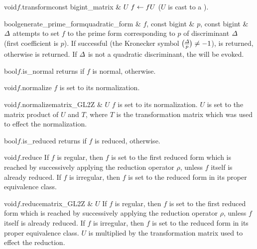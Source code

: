 \begin{fcode}{void}{$f$.transform}{const bigint_matrix & $U$}
  $f \leftarrow fU$ ($U$ is cast to a ).
\end{fcode}

\begin{fcode}{bool}{generate_prime_form}{quadratic_form & $f$, const bigint & $p$,
    const bigint & $\varDelta$}%
  attempts to set $f$ to the prime form corresponding to $p$ of discriminant $\varDelta$ (first
  coefficient is $p$).  If successful (the Kronecker symbol $\kronecker{\D}{p} \neq -1$), \TRUE
  is returned, otherwise \FALSE is returned.  If $\varDelta$ is not a quadratic discriminant, the \LEH
  will be evoked.
\end{fcode}




\begin{fcode}{bool}{$f$.is_normal}{}
  returns \TRUE if $f$ is normal, \FALSE otherwise.
\end{fcode}

\begin{fcode}{void}{$f$.normalize}{}
  $f$ is set to its normalization.
\end{fcode}

\begin{fcode}{void}{$f$.normalize}{matrix_GL2Z & $U$}
  $f$ is set to its normalization.  $U$ is set to the matrix product of $U$ and $T$, where $T$
  is the transformation matrix which was used to effect the normalization.
\end{fcode}

\begin{fcode}{bool}{$f$.is_reduced}{}
  returns \TRUE if $f$ is reduced, \FALSE otherwise.
\end{fcode}

\begin{fcode}{void}{$f$.reduce}{}
  If $f$ is regular, then $f$ is set to the first reduced form which is reached by successively
  applying the reduction operator $\rho$, unless $f$ itself is already reduced.  If $f$ is
  irregular, then $f$ is set to the reduced form in its proper equivalence class.
\end{fcode}

\begin{fcode}{void}{$f$.reduce}{matrix_GL2Z & $U$}
  If $f$ is regular, then $f$ is set to the first reduced form which is reached by successively
  applying the reduction operator $\rho$, unless $f$ itself is already reduced.  If $f$ is
  irregular, then $f$ is set to the reduced form in its proper equivalence class.  $U$ is
  multiplied by the transformation matrix used to effect the reduction.
\end{fcode}

